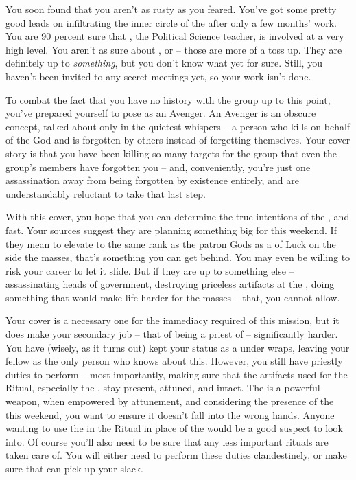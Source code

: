 \documentclass[char]{GL2020}
\begin{document}
You soon found that you aren’t as rusty as you feared. You’ve got some pretty good leads on infiltrating the inner circle of the \pGoaties{} after only a few months' work. You are 90 percent sure that \cChupInventor{}, the Political Science teacher, is involved at a very high level. You aren’t as sure about \cChupSecond{}, or \cWildCard{} -- those are more of a toss up. They are definitely up to \emph{something}, but you don’t know what yet for sure. Still, you haven’t been invited to any secret meetings yet, so your work isn’t done. 

To combat the fact that you have no history with the group up to this point, you’ve prepared yourself to pose as an Avenger. An Avenger is an obscure concept, talked about only in the quietest whispers -- a person who kills on behalf of the God \cGenesis{} and is forgotten by others instead of forgetting themselves. Your cover story is that you have been killing so many targets for the group that even the group’s members have forgotten you -- and, conveniently, you’re just one assassination away from being forgotten by existence entirely, and are understandably reluctant to take that last step.

With this cover, you hope that you can determine the true intentions of the \pGoaties{}, and fast. Your sources suggest they are planning something big for this weekend. If they mean to elevate \cGenesis{} to the same rank as the patron Gods as a \cGenesis{\Deity} of Luck on the side the masses, that’s something you can get behind. You may even be willing to risk your career to let it slide. But if they are up to something else -- assassinating heads of government, destroying priceless artifacts at the \pSchool{}, doing something that would make life harder for the masses -- that, you cannot allow.

Your cover is a necessary one for the immediacy required of this mission, but it does make your secondary job -- that of being a priest of \cFarmGod{} -- significantly harder. You have (wisely, as it turns out) kept your status as a \cInterpol{\cleric} under wraps, leaving your fellow \pFarm{} \cHedonist{\cleric} \cHedonist{} as the only person who knows about this. However, you still have priestly duties to perform -- most importantly, making sure that the artifacts used for the Ritual, especially the \iScythe{}, stay present, attuned, and intact. The \iScythe{} is a powerful weapon, when empowered by attunement, and considering the presence of the \pGoaties{} this weekend, you want to ensure it doesn’t fall into the wrong hands. Anyone wanting to use the \iPitcher{} in the Ritual in place of the \iScythe{} would be a good suspect to look into. Of course you’ll also need to be sure that any less important rituals are taken care of. You will either need to perform these duties clandestinely, or make sure that \cHedonist{} can pick up your slack.
\end{document}
